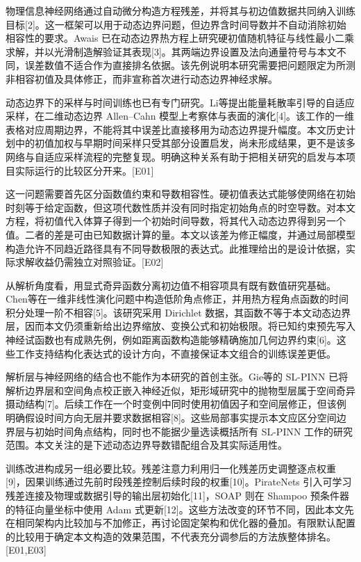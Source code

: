 \documentclass[11pt,a4paper]{article}
\begin{document}
物理信息神经网络通过自动微分构造方程残差，并将其与初边值数据共同纳入训练目标{[}2{]}。这一框架可以用于动态边界问题，但边界含时间导数并不自动消除初始相容性的要求。Awais 已在动态边界热方程上研究硬初值随机特征与线性最小二乘求解，并以光滑制造解验证其表现{[}3{]}。其两端边界设置及法向通量符号与本文不同，误差数值不适合作为直接排名依据。该先例说明本研究需要把问题限定为所测非相容初值及具体修正，而非宣称首次进行动态边界神经求解。

动态边界下的采样与时间训练也已有专门研究。Li等提出能量耗散率引导的自适应采样，在二维动态边界 Allen--Cahn 模型上考察体与表面的演化{[}4{]}。该工作的一维表格对应周期边界，不能将其中误差比直接移用为动态边界提升幅度。本文历史计划中的初值加权与早期时间采样只受其部分设置启发，尚未形成结果，更不是该多网络与自适应采样流程的完整复现。明确这种关系有助于把相关研究的启发与本项目实际运行的比较区分开来。{[}E01{]}

这一问题需要首先区分函数值约束和导数相容性。硬初值表达式能够使网络在初始时刻等于给定函数，但这项代数性质并没有同时指定初始角点的时空导数。对本文方程，将初值代入体算子得到一个初始时间导数，将其代入动态边界得到另一个值。二者的差是可由已知数据计算的量。本文以该差为修正幅度，并通过局部模型构造允许不同趋近路径具有不同导数极限的表达式。此推理给出的是设计依据，实际求解收益仍需独立对照验证。{[}E02{]}

从解析角度看，用显式奇异函数分离初边值不相容项具有既有数值研究基础。Chen等在一维非线性演化问题中构造低阶角点修正，并用热方程角点函数的时间积分处理一阶不相容{[}5{]}。该研究采用 Dirichlet 数据，其函数不等于本文动态边界层，因而本文仍须重新给出边界缩放、变换公式和初始极限。将已知约束预先写入神经试函数也有成熟先例，例如距离函数构造能够精确施加几何边界约束{[}6{]}。这些工作支持结构化表达式的设计方向，不直接保证本文组合的训练误差更低。

解析层与神经网络的结合也不能作为本研究的首创主张。Gie等的 SL-PINN 已将解析边界层和空间角点校正嵌入神经近似，矩形域研究中的抛物型层属于空间奇异摄动结构{[}7{]}。后续工作在一个时变例中同时使用初值因子和空间层修正，但该例明确假设时间方向无层并要求数据相容{[}8{]}。这些局部事实提示本文应区分空间边界层与初始时间角点结构，同时也不能据少量选读概括所有 SL-PINN 工作的研究范围。本文关注的是下述动态边界导数错配组合及其实际适用性。

训练改进构成另一组必要比较。残差注意力利用归一化残差历史调整逐点权重{[}9{]}，因果训练通过先前时段残差控制后续时段的权重{[}10{]}。PirateNets 引入可学习残差连接及物理或数据引导的输出层初始化{[}11{]}，SOAP 则在 Shampoo 预条件器的特征向量坐标中使用 Adam 式更新{[}12{]}。这些方法改变的环节不同，因此本文先在相同架构内比较加与不加修正，再讨论固定架构和优化器的叠加。有限默认配置的比较用于确定本文构造的效果范围，不代表充分调参后的方法族整体排名。{[}E01,E03{]}
\end{document}
